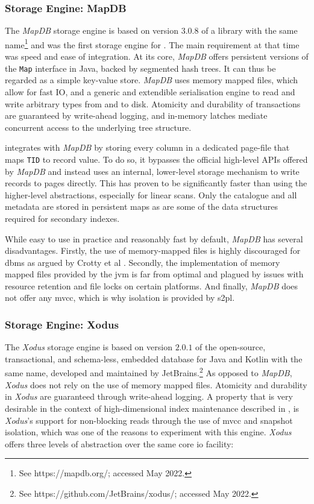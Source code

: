 \subsubsection{Storage Engine: MapDB}

The \emph{MapDB} storage engine is based on version $3.0.8$ of a library with the same name\footnote{See https://mapdb.org/; accessed May 2022.} and was the first storage engine for \cottontail{}. The main requirement at that time was speed and ease of integration. At its core, \emph{MapDB} offers persistent versions of the \texttt{Map} interface in Java, backed by segmented hash trees. It can thus be regarded as a simple key-value store. \emph{MapDB} uses memory mapped files, which allow for fast IO, and a generic and extendible serialisation engine to read and write arbitrary types from and to disk. Atomicity and durability of transactions are guaranteed by write-ahead logging, and in-memory latches mediate concurrent access to the underlying tree structure.

\cottontail{} integrates with \emph{MapDB} by storing every column in a dedicated page-file that maps \texttt{TID} to record value. To do so, it bypasses the official high-level APIs offered by \emph{MapDB} and instead uses an internal, lower-level storage mechanism to write records to pages directly. This has proven to be significantly faster than using the higher-level abstractions, especially for linear scans. Only the catalogue and all metadata are stored in persistent maps as are some of the data structures required for secondary indexes.

While easy to use in practice and reasonably fast by default, \emph{MapDB} has several disadvantages. Firstly, the use of memory-mapped files is highly discouraged for \acrshort{dbms} as argued by Crotty et al \cite{Crotty:2022Are}. Secondly, the implementation of memory mapped files provided by the \acrshort{jvm} is far from optimal and plagued by issues with resource retention and file locks on certain platforms. And finally, \emph{MapDB} does not offer any \acrshort{mvcc}, which is why isolation is provided by \acrshort{s2pl}.

\subsubsection{Storage Engine: Xodus}
The \emph{Xodus} storage engine is based on version $2.0.1$ of the open-source, transactional, and schema-less, embedded database for Java and Kotlin with the same name, developed and maintained by JetBrains.\footnote{See https://github.com/JetBrains/xodus/; accessed May 2022.} As opposed to \emph{MapDB}, \emph{Xodus} does not rely on the use of memory mapped files. Atomicity and durability in \emph{Xodus} are guaranteed through write-ahead logging. A property that is very desirable in the context of high-dimensional index maintenance described in , is \emph{Xodus}'s support for non-blocking reads through the use of \acrshort{mvcc} and snapshot isolation, which was one of the reasons to experiment with this engine. \emph{Xodus} offers three levels of abstraction over the same core \acrshort{io} facility:

